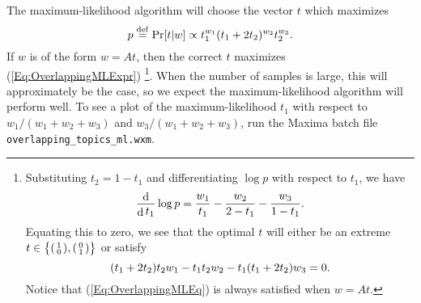 \documentclass{article}
\newcommand{\DefEq}{\stackrel{\mathrm{def}}{=}}
\DeclareMathOperator{\D}{d}
\begin{document}
The maximum-likelihood algorithm will choose the vector \(t\) which maximizes
\begin{equation}
    \label{Eq:OverlappingMLExpr}
    p \DefEq \Pr[ t | w ] \propto t_1^{w_1} (t_1 + 2 t_2)^{w_2} t_2^{w_3}
    \ldotp
\end{equation}
If \(w\) is of the form \(w = A t\), then the correct \(t\) maximizes (\ref{Eq:OverlappingMLExpr})%
    \footnote{%
        Substituting \(t_2 = 1 - t_1\) and differentiating \(\log p\) with respect to \(t_1\), we have
        \[ \frac {\D} {\D t_1} \log p = \frac {w_1} {t_1} - \frac {w_2} {2 - t_1} - \frac {w_3} {1 - t_1} \ldotp \]
        Equating this to zero, we see that the optimal \(t\) will either be an extreme \(t \in \big\{ \begin{psmallmatrix} 1 \\ 0 \end{psmallmatrix}, \begin{psmallmatrix} 0 \\ 1 \end{psmallmatrix} \big\}\) or satisfy
        \begin{equation}
            \label{Eq:OverlappingMLEq}
            (t_1 + 2 t_2) t_2 w_1 - t_1 t_2 w_2 - t_1 (t_1 + 2 t_2) w_3 = 0 \ldotp
        \end{equation}
    Notice that (\ref{Eq:OverlappingMLEq}) is always satisfied when \(w = A t\).
    }.
When the number of samples is large, this will approximately be the case, so we expect the maximum-likelihood algorithm will perform well.
To see a plot of the maximum-likelihood \(t_1\) with respect to \(w_1 / (w_1 + w_2 + w_3)\) and \(w_3 / (w_1 + w_2 + w_3)\), run the Maxima batch file \texttt{overlapping\_topics\_ml.wxm}.

{}

\end{document}

